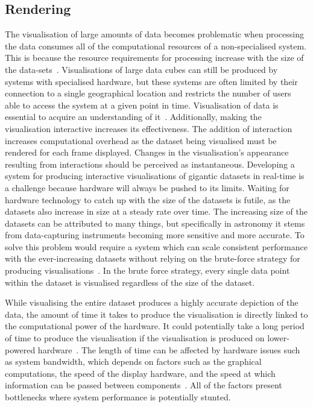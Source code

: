 \subsection{Rendering}
\label{sec:rendering-strategy}
The visualisation of large amounts of data becomes problematic when processing the data consumes all of the computational resources of a non-specialised system. 
This is because the resource requirements for processing increase with the size of the data-sets~\cite{Shneiderman2008}. 
Visualisations of large data cubes can still be produced by systems with specialised hardware, but these systems are often limited by their connection to a single geographical location and restricts the number of users able to access the system at a given point in time.
Visualisation of data is essential to acquire an understanding of it~\cite{Yang2017}. 
Additionally, making the visualisation interactive increases its effectiveness. 
The addition of interaction increases computational overhead as the dataset being visualised must be rendered for each frame displayed.
Changes in the visualisation's appearance resulting from interactions should be perceived as instantaneous. 
Developing a system for producing interactive visualisations of gigantic datasets in real-time is a challenge because hardware will always be pushed to its limits. 
Waiting for hardware technology to catch up with the size of the datasets is futile, as the datasets also increase in size at a steady rate over time.
The increasing size of the datasets can be attributed to many things, but specifically in astronomy it stems from data-capturing instruments becoming more sensitive and more accurate.
To solve this problem would require a system which can scale consistent performance with the ever-increasing datasets without relying on the brute-force strategy for producing visualisations~\cite{Ali2016}.
In the brute force strategy, every single data point within the dataset is visualised regardless of the size of the dataset.

While visualising the entire dataset produces a highly accurate depiction of the data, the amount of time it takes to produce the visualisation is directly linked to the computational power of the hardware.
It could potentially take a long period of time to produce the visualisation if the visualisation is produced on lower-powered hardware~\cite{Fisher2012}.
The length of time can be affected by hardware issues such as system bandwidth, which depends on factors such as the graphical computations, the speed of the display hardware, and the speed at which information can be passed between components~\cite{Becker1987}.
All of the factors present bottlenecks where system performance is potentially stunted.

